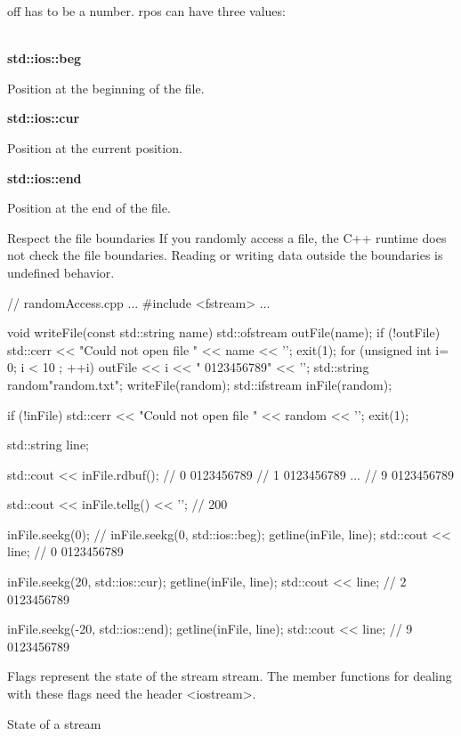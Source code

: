 off has to be a number. rpos can have three values:

\noindent
\\\textbf{std::ios::beg}

Position at the beginning of the file.

\noindent
\textbf{std::ios::cur}

Position at the current position.

\noindent
\textbf{std::ios::end}

Position at the end of the file.

\begin{myWarning}{Respect the file boundaries}
If you randomly access a file, the C++ runtime does not check the file boundaries. Reading or writing data outside the boundaries is undefined behavior.
\end{myWarning}


\begin{cpp}
// randomAccess.cpp
...
#include <fstream>
...

void writeFile(const std::string name){
	std::ofstream outFile(name);
	if (!outFile){
		std::cerr << "Could not open file " << name << '\n';
		exit(1);
	}
	for (unsigned int i= 0; i < 10 ; ++i){
		outFile << i << " 0123456789" << '\n';
	}
}
std::string random{"random.txt"};
writeFile(random);
std::ifstream inFile(random);

if (!inFile){
	std::cerr << "Could not open file " << random << '\n';
	exit(1);
}

std::string line;

std::cout << inFile.rdbuf();
// 0 0123456789
// 1 0123456789
...
// 9 0123456789

std::cout << inFile.tellg() << '\n'; // 200

inFile.seekg(0); // inFile.seekg(0, std::ios::beg);
getline(inFile, line);
std::cout << line; // 0 0123456789

inFile.seekg(20, std::ios::cur);
getline(inFile, line);
std::cout << line; // 2 0123456789

inFile.seekg(-20, std::ios::end);
getline(inFile, line);
std::cout << line; // 9 0123456789
\end{cpp}


Flags represent the state of the stream stream. The member functions for dealing with these flags need the header <iostream>.

\begin{center}
State of a stream
\end{center}


